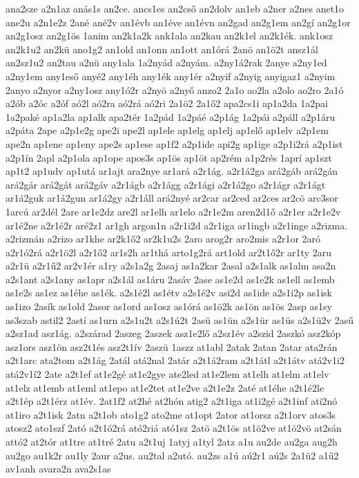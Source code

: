 {ana2sze
a2n1az
anás1s
an2ce.
ancs1es
an2cső
an2dolv
an1eb
a2ner
a2nes
anet1o
ane2u
a2n1e2z
2ané
ané2v
an1évb
an1éve
an1évn
an2gad
an2g1em
an2gí
an2g1or
an2g1osz
an2g1ös
1anim
an2k1a2k
ank1ala
an2kau
an2k1el
an2k1ék.
ank1osz
an2k1u2
an2kü
ano1g2
an1old
an1onn
an1ott
an1órá
2anö
an1ö2t
ansz1ál
an2sz1u2
an2tau
a2nü
any1ala
1a2nyád
a2nyám.
a2ny1á2rak
2anye
a2ny1ed
a2ny1em
any1eső
anyé2
any1éh
any1ék
any1ér
a2nyif
a2nyig
anyigaz1
a2nyim
2anyo
a2nyor
a2ny1osz
any1ó2r
a2nyö
a2nyő
anzo2
2a1o
ao2la
a2olo
ao2ro
2a1ó
a2ób
a2óc
a2óf
aó2l
aó2ra
aó2rá
aó2ri
2a1ö2
2a1ő2
apa2cs1i
ap1a2da
1a2pai
1a2paké
ap1a2la
ap1alk
apa2tér
1a2pád
1a2páé
a2p1ág
1a2pái
a2páll
a2p1áru
a2páta
2ape
a2p1e2g
ape2i
ape2l
ap1ele
ap1elg
ap1elj
ap1elő
ap1elv
a2p1em
ape2n
ap1ene
ap1eny
ape2s
ap1ese
ap1f2
a2p1ide
api2g
ap1ige
a2p1i2rá
a2p1ist
a2p1ín
2apl
a2p1ola
ap1ope
apos3s
ap1ös
ap1öt
ap2rém
a1p2rés
1aprí
ap1szt
ap1t2
ap1udv
ap1utá
ar1ajt
ara2nye
ar1ará
a2r1ág.
a2r1á2ga
ará2gáb
ará2gán
ará2gár
ará2gát
ará2gáv
a2r1ágb
a2r1ágg
a2r1ági
a2r1á2go
a2r1ágr
a2r1ágt
ar1á2guk
ar1á2gun
ar1á2gy
a2r1áll
ará2nyé
ar2car
ar2ced
ar2ces
ar2cö
arc3sor
1arcú
ar2dél
2are
ar1e2dz
are2l
ar1elh
ar1elo
a2r1e2m
aren2d1ő
a2r1er
a2r1e2v
ar1é2ne
a2r1é2r
aré2z1
ar1gh
argon1n
a2r1i2d
a2r1iga
ar1ingb
a2r1inge
a2rizma.
a2rizmán
a2rizo
ar1khe
ar2k1ő2
ar2k1u2s
2aro
arog2r
aro2mis
a2r1or
2aró
a2r1ó2rá
a2r1ö2l
a2r1ő2
ar1s2h
ar1thá
arto1g2rá
art1old
ar2t1ő2r
ar1ty
2aru
a2r1ü
a2r1ű2
ar2v1ér
a1ry
a2s1a2g
2asaj
as1a2kar
2asal
a2s1alk
as1alm
asa2n
a2s1ant
a2s1any
as1apr
a2s1ál
as1áru
2asáv
2ase
as1e2d
as1e2k
as1ell
as1emb
as1e2s
as1ez
as1éhe
as1ék.
a2s1é2l
as1étv
a2s1é2v
asi2d
as1ide
a2s1i2p
as1isk
as1izo
2asík
as1old
2asor
as1ord
as1osz
as1órá
as1ö2k
as1ön
as1ös
2asp
as1sy
as3szab
astil2
2astí
as1urn
a2s1u2t
a2s1ú2t
2asü
as1ün
a2s1ür
as1üs
a2s1ü2v
2asű
a2sz1ad
asz1ág.
a2szárad
2aszeg
2aszek
asz1e2lő
a2sz1év
a2szid
2aszkó
asz2kóp
asz1ors
asz1ön
asz2t1és
asz2t1ív
2aszü
1aszz
at1abl
2atak
2atan
2atar
ata2rán
a2t1arc
ata2tom
a2t1ág
2atál
atá2nal
2atár
a2t1á2ram
a2t1átl
a2t1átv
atá2v1i2
atá2v1í2
2ate
a2t1ef
at1e2gé
at1e2gye
ate2led
at1e2lem
at1elh
at1elm
at1elv
at1elz
at1emb
at1eml
at1epo
at1e2tet
at1e2ve
a2t1e2z
2até
at1éhe
a2t1é2le
a2t1ép
a2t1érz
at1év.
2at1f2
at2hé
at2hón
atig2
a2t1iga
at1i2gé
a2t1inf
ati2nó
at1iro
a2t1isk
2atn
a2t1ob
ato1g2
ato2me
at1opt
2ator
at1orsz
a2t1orv
atos3s
atosz2
ato1szf
2ató
a2t1ó2rá
ató2riá
ató1sz
2atö
a2t1ös
at1ö2ve
at1ö2vö
at2sán
attó2
at2tór
at1tre
at1tré
2atu
a2t1uj
1atyj
a1tyl
2atz
a1u
au2de
au2ga
aug2h
au2go
au1k2r
au1ly
2aur
a2us.
au2tal
a2utó.
au2zs
a1ú
aú2r1
aú2s
2a1ü2
a1ű2
av1anh
avara2n
ava2s1as
}
